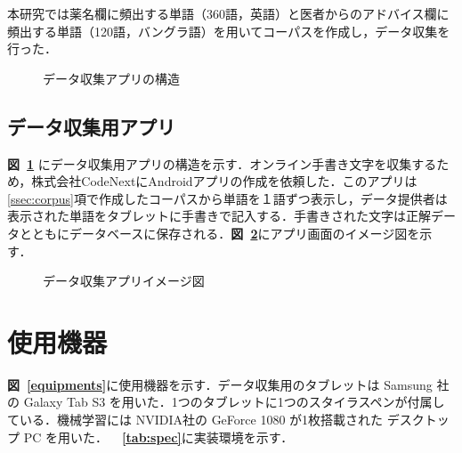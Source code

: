 本研究では薬名欄に頻出する単語（360語，英語）と医者からのアドバイス欄に頻出する単語（120語，バングラ語）を用いてコーパスを作成し，データ収集を行った．

\begin{figure}[tb]
 \begin{center}
  \caption{データ収集アプリの構造}
  \label{app_structure}
\end{center}
\end{figure}
%
\subsection{データ収集用アプリ}
\label{ssec:app}
\textbf{図~\ref{app_structure}} にデータ収集用アプリの構造を示す．オンライン手書き文字を収集するため，株式会社CodeNext\cite{codenext}にAndroidアプリの作成を依頼した．このアプリは\ref{ssec:corpus}項で作成したコーパスから単語を１語ずつ表示し，データ提供者は表示された単語をタブレットに手書きで記入する．手書きされた文字は正解データとともにデータベースに保存される．\textbf{図~\ref{app_image}}にアプリ画面のイメージ図を示す．

\begin{figure}[tb]
 \begin{center}
  \caption{データ収集アプリイメージ図}
  \label{app_image}
\end{center}
\end{figure}

\section{使用機器}
\label{sec:machine}
\textbf{図~\ref{equipments}}に使用機器を示す．データ収集用のタブレットは Samsung 社の Galaxy Tab S3 を用いた．1つのタブレットに1つのスタイラスペンが付属している．機械学習には NVIDIA社の GeForce 1080 が1枚搭載された デスクトップ PC を用いた．\textbf{~\tablename~\ref{tab:spec}}に実装環境を示す．

